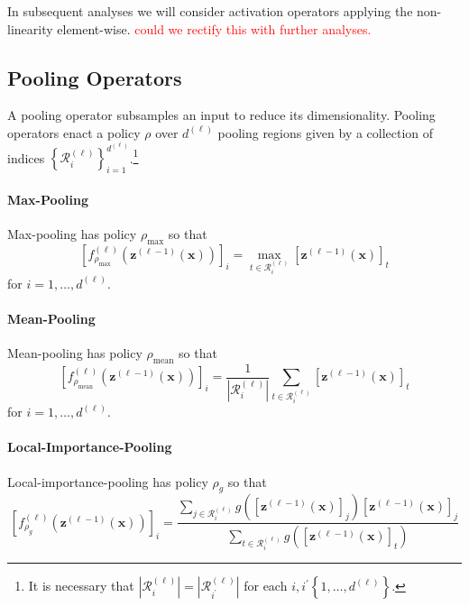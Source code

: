 In subsequent analyses we will consider activation operators applying the non-linearity element-wise. \textcolor{Red}{could we rectify this with further analyses.}

\subsection{Pooling Operators}

A pooling operator subsamples an input to reduce its dimensionality. Pooling operators enact a policy $\rho$ over $d^{(\ell)}$ pooling regions given by a collection of indices $\left\{\mathcal{R}_i^{(\ell)}\right\}_{i=1}^{d^{(\ell)}}$.\footnote{It is necessary that $\left\vert\mathcal{R}_i^{(\ell)}\right\vert=\left\vert\mathcal{R}^{(\ell)}_{i^\prime}\right\vert$ for each $i,i^\prime\left\{1,\dots,d^{(\ell)}\right\}$.}

\paragraph{Max-Pooling}

Max-pooling has policy $\rho_{\text{max}}$ so that $$\left[f_{\rho_{\text{max}}}^{(\ell)}\left(\mathbf{z}^{(\ell-1)}(\mathbf{x})\right)\right]_i=\max_{t\in\mathcal{R}_i^{(\ell)}}\left[\mathbf{z}^{(\ell-1)}(\mathbf{x})\right]_t$$for $i=1,\dots,d^{(\ell)}$.

\paragraph{Mean-Pooling}

Mean-pooling has policy $\rho_{\text{mean}}$ so that $$\left[f_{\rho_{\text{mean}}}^{(\ell)}\left(\mathbf{z}^{(\ell-1)}(\mathbf{x})\right)\right]_i=\frac{1}{\left\vert\mathcal{R}^{(\ell)}_i\right\vert}\sum_{t\in\mathcal{R}^{(\ell)}_i}\left[\mathbf{z}^{(\ell-1)}(\mathbf{x})\right]_t$$for $i=1,\dots,d^{(\ell)}$.

\paragraph{Local-Importance-Pooling}

Local-importance-pooling \citep{gaoLIPLocalImportanceBased2023} has policy $\rho_{g}$ so that $$\left[f^{(\ell)}_{\rho_{g}}\left(\mathbf{z}^{(\ell-1)}(\mathbf{x})\right)\right]_i=\frac{\sum_{j\in\mathcal{R}_i^{(\ell)}}g\left(\left[\mathbf{z}^{(\ell-1)}(\mathbf{x})\right]_j\right)\left[\mathbf{z}^{(\ell-1)}(\mathbf{x})\right]_j}{\sum_{t\in\mathcal{R}^{(\ell)}_i}g\left(\left[\mathbf{z}^{(\ell-1)}(\mathbf{x})\right]_t\right)}$$


